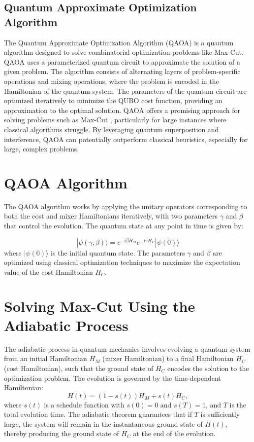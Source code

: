 \documentclass[12pt]{article}
\begin{document}
\subsection{Quantum Approximate Optimization Algorithm}
The Quantum Approximate Optimization Algorithm (QAOA) is a quantum algorithm designed to solve combinatorial optimization problems like Max-Cut. QAOA uses a parameterized quantum circuit to approximate the solution of a given problem. The algorithm consists of alternating layers of problem-specific operations and mixing operations, where the problem is encoded in the Hamiltonian of the quantum system. The parameters of the quantum circuit are optimized iteratively to minimize the QUBO cost function, providing an approximation to the optimal solution.
QAOA offers a promising approach for solving problems such as Max-Cut \cite{farhi2014qaoa}, particularly for large instances where classical algorithms struggle. By leveraging quantum superposition and interference, QAOA can potentially outperform classical heuristics, especially for large, complex problems.
\section{QAOA Algorithm}


The QAOA algorithm works by applying the unitary operators corresponding to both the cost and mixer Hamiltonians iteratively, with two parameters \( \gamma \) and \( \beta \) that control the evolution. The quantum state at any point in time is given by:

\[
|\psi(\gamma, \beta)\rangle = e^{-i \beta H_M} e^{-i \gamma H_C} |\psi(0)\rangle
\]
where \( |\psi(0)\rangle \) is the initial quantum state. The parameters \( \gamma \) and \( \beta \) are optimized using classical optimization techniques to maximize the expectation value of the cost Hamiltonian \( H_C \).
\section{Solving Max-Cut Using the Adiabatic Process}
The adiabatic process in quantum mechanics involves evolving a quantum system from an initial Hamiltonian \( H_M \) (mixer Hamiltonian) to a final Hamiltonian \( H_C \) (cost Hamiltonian), such that the ground state of \( H_C \) encodes the solution to the optimization problem. The evolution is governed by the time-dependent Hamiltonian:
\[
H(t) = (1 - s(t)) H_M + s(t) H_C,
\]
where \( s(t) \) is a schedule function with \( s(0) = 0 \) and \( s(T) = 1 \), and \( T \) is the total evolution time. The adiabatic theorem guarantees that if \( T \) is sufficiently large, the system will remain in the instantaneous ground state of \( H(t) \), thereby producing the ground state of \( H_C \) at the end of the evolution.
\end{document}
